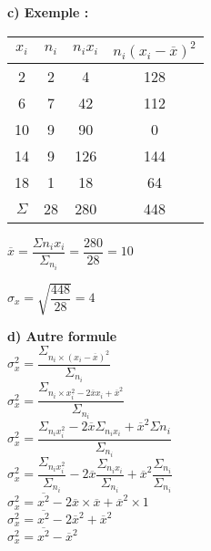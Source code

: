 \textbf{c) Exemple :} \\

\begin{tabular}{c|c|c|c}
$x_i$ & $n_i$ & $n_ix_i$ & $n_i\left(x_i - \overline{x}\right)^2$ \\
\hline
2 & 2 & 4 & 128 	\\
6 & 7 & 42 & 112 \\
10 & 9 & 90 & 0 \\
14 & 9 & 126 & 144 \\
18 & 1 & 18 & 64 \\
\hline
$\Sigma$ & 28 & 280 & 448 \\
\end{tabular}

\vspace*{.3cm}

$ \overline{x} = \dfrac{\Sigma{n_ix_i}}{\Sigma_{n_i}} = \dfrac{280}{28} = 10 $ \\

\vspace*{.3cm}

$\sigma_x = \sqrt{\dfrac{448}{28}} = 4 $ \\

\newpage

\textbf{d) Autre formule} \\

$ \sigma_x^2 = \dfrac{\Sigma_{n_i \times \left(x_i - \overline{x}\right)^2}}{\Sigma_{n_i}} $ \\

$ \sigma_x^2 = \dfrac{\Sigma_{n_i \times x_i^2 - 2\overline{x}x_i + \overline{x}^2}}{\Sigma_{n_i}} $ \\

$ \sigma_x^2 = \dfrac{\Sigma_{n_ix_i^2} - 2\overline{x}\Sigma_{n_ix_i} + \overline{x}^2\Sigma{n_i}}{\Sigma_{n_i}} $ \\

$ \sigma_x^2 = \dfrac{\Sigma_{n_ix_i^2}}{\Sigma_{n_i}} - 2\overline{x} \dfrac{\Sigma_{n_ix_i}}{\Sigma_{n_i}} + \overline{x}^2 \dfrac{\Sigma_{n_i}}{\Sigma_{n_i}} $ \\

$ \sigma_x^2 = \overline{x^2} - 2\overline{x} \times \overline{x} + \overline{x}^2 \times 1 $ \\

$ \sigma_x^2 = \overline{x^2} - 2\overline{x}^2 + \overline{x}^2 $ \\

$ \sigma_x^2 = \overline{x^2} - \overline{x}^2 $

